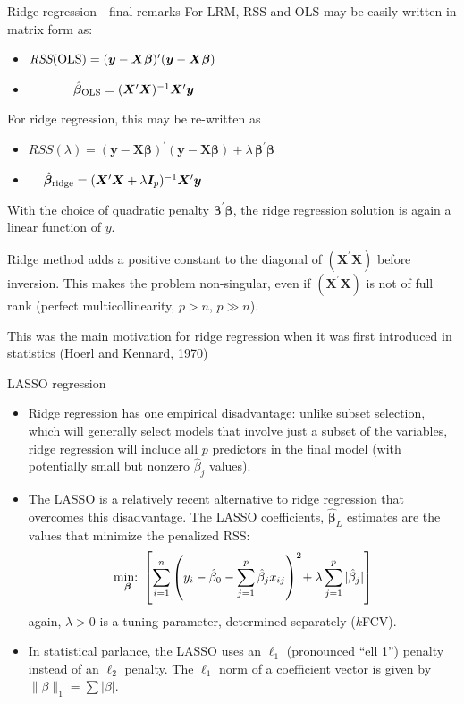 \documentclass{beamer}
\begin{document}
\begin{frame}{Ridge regression - final remarks}
For LRM, RSS and OLS may be easily written in matrix form as:
\begin{itemize}
\item $\textit{RSS}(\textnormal{OLS}) = (\bm{y}-\bm{X\beta})^{\prime}(\bm{y}-\bm{X\beta})$
\item ~~~~~~~$\hat{\bm{\beta}}_{\textnormal{OLS}} = (\bm{X}^{\prime}\bm{X})^{-1}\bm{X}^{\prime}\bm{y}$ 
\end{itemize}
For ridge regression, this may be re-written as
\begin{itemize}
\item $\textit{RSS}(\lambda) = (\bm{y}-\bm{X\beta})^{\prime}(\bm{y}-\bm{X\beta}) 
+ \lambda \,\bm{\beta}^{\prime} \!\bm{\beta}$
\item ~~$\,\hat{\bm{\beta}}_{\textnormal{ridge}} = (\bm{X}^{\prime}\bm{X} + \lambda \bm{I}_p )^{-1}\bm{X}^{\prime}\bm{y}$ 
\end{itemize}

With the choice of quadratic penalty $\bm{\beta}^{\prime} \!\bm{\beta}$, the ridge regression solution is again a linear function of $y$. 

\medskip
Ridge method adds a positive constant to the diagonal of $(\bm{X}^{\prime}\bm{X})$ before inversion. This makes the problem non-singular, even if $(\bm{X}^{\prime}\bm{X})$ is not of full rank (perfect multicollinearity, $p>n$, $p \gg n$).

\medskip
This was the main motivation for ridge regression when it was first introduced in statistics (Hoerl and Kennard, 1970)

\end{frame}
\begin{frame}{LASSO regression}
\begin{itemize}
\item Ridge regression has one empirical disadvantage:
unlike subset selection, which will generally select models
that involve just a subset of the variables, ridge regression
will include all $p$ predictors in the final model (with potentially small but nonzero $\hat{\beta}_{j}$ values).
\medskip
\item The LASSO is a relatively recent alternative to ridge
regression that overcomes this disadvantage. The LASSO
coefficients,  $\bm{\hat{\beta}}_{\!L}$ estimates 
are the values that minimize the penalized RSS:
$$
\underset{\bm{\beta}}{\textnormal{min:~}} 
\left[
\sum_{i=1}^n \left(y_i - \hat{\beta}_0 
- \sum_{j=1}^p  \hat{\beta}_j x_{ij} \right)^2 
\! + \lambda \sum_{j=1}^p  | \hat{\beta}_j | \right]$$
again, $\lambda > 0$ is a tuning parameter, determined separately ($k$FCV).
\item In statistical parlance, the LASSO uses an $\ell_1$ (pronounced ``ell 1'') penalty instead of an $\ell_2$ penalty. The $\ell_1$ norm of a coefficient vector  is given by 
$\| \beta \|_1 = \sum | \beta |$.
\end{itemize}
\end{frame}
\end{document}
